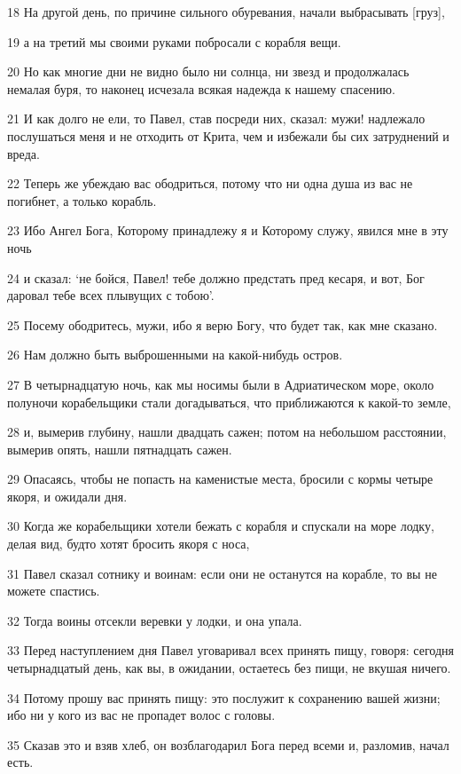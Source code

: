 \par 18 На другой день, по причине сильного обуревания, начали выбрасывать [груз],
\par 19 а на третий мы своими руками побросали с корабля вещи.
\par 20 Но как многие дни не видно было ни солнца, ни звезд и продолжалась немалая буря, то наконец исчезала всякая надежда к нашему спасению.
\par 21 И как долго не ели, то Павел, став посреди них, сказал: мужи! надлежало послушаться меня и не отходить от Крита, чем и избежали бы сих затруднений и вреда.
\par 22 Теперь же убеждаю вас ободриться, потому что ни одна душа из вас не погибнет, а только корабль.
\par 23 Ибо Ангел Бога, Которому принадлежу я и Которому служу, явился мне в эту ночь
\par 24 и сказал: `не бойся, Павел! тебе должно предстать пред кесаря, и вот, Бог даровал тебе всех плывущих с тобою'.
\par 25 Посему ободритесь, мужи, ибо я верю Богу, что будет так, как мне сказано.
\par 26 Нам должно быть выброшенными на какой-нибудь остров.
\par 27 В четырнадцатую ночь, как мы носимы были в Адриатическом море, около полуночи корабельщики стали догадываться, что приближаются к какой-то земле,
\par 28 и, вымерив глубину, нашли двадцать сажен; потом на небольшом расстоянии, вымерив опять, нашли пятнадцать сажен.
\par 29 Опасаясь, чтобы не попасть на каменистые места, бросили с кормы четыре якоря, и ожидали дня.
\par 30 Когда же корабельщики хотели бежать с корабля и спускали на море лодку, делая вид, будто хотят бросить якоря с носа,
\par 31 Павел сказал сотнику и воинам: если они не останутся на корабле, то вы не можете спастись.
\par 32 Тогда воины отсекли веревки у лодки, и она упала.
\par 33 Перед наступлением дня Павел уговаривал всех принять пищу, говоря: сегодня четырнадцатый день, как вы, в ожидании, остаетесь без пищи, не вкушая ничего.
\par 34 Потому прошу вас принять пищу: это послужит к сохранению вашей жизни; ибо ни у кого из вас не пропадет волос с головы.
\par 35 Сказав это и взяв хлеб, он возблагодарил Бога перед всеми и, разломив, начал есть.
